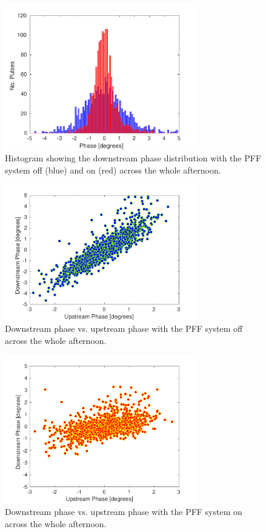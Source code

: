 \begin{figure}
  \centering
  \includegraphics[width=0.75\textwidth]{Figures/feedforward/longFF_histDownstreamPhase}
  \caption{Histogram showing the downstream phase distribution with the PFF system off (blue) and on (red) across the whole afternoon.}
  \label{f:longFF_histDownstreamPhase}
\end{figure}

\begin{figure}
  \centering
  \includegraphics[width=0.75\textwidth]{Figures/feedforward/longFF_scatterFFOff}
  \caption{Downstream phase vs. upstream phase with the PFF system off across the whole afternoon.}
  \label{f:longFF_scatterFFOff}
\end{figure}

\begin{figure}
  \centering
  \includegraphics[width=0.75\textwidth]{Figures/feedforward/longFF_scatterFFOn}
  \caption{Downstream phase vs. upstream phase with the PFF system on across the whole afternoon.}
  \label{f:longFF_scatterFFOn}
\end{figure}

